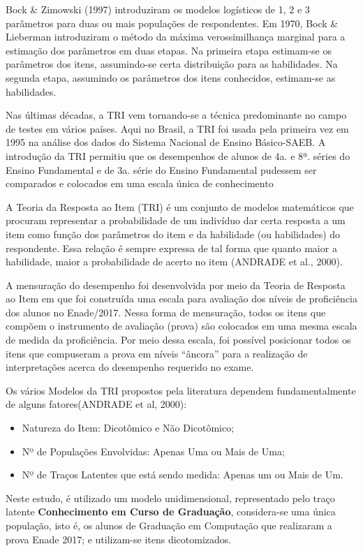 \documentclass[12pt]{article}
\begin{document}
Bock \& Zimowski (1997) introduziram os modelos logísticos de 1, 2 e 3 parâmetros para duas ou mais populações de respondentes. Em 1970, Bock \& Lieberman introduziram o método da máxima verossimilhança marginal para a estimação dos parâmetros em duas etapas. Na primeira etapa estimam-se os parâmetros dos itens, assumindo-se certa distribuição para as habilidades. Na segunda etapa, assumindo os parâmetros dos itens conhecidos, estimam-se as habilidades.

Nas últimas décadas, a TRI vem tornando-se a técnica predominante no campo de testes em vários países. Aqui no Brasil, a TRI foi usada pela primeira vez em 1995 na análise dos dados do Sistema Nacional de Ensino Básico-SAEB. A introdução da TRI permitiu que os desempenhos de alunos de 4a. e 8ª. séries do Ensino Fundamental e de 3a. série do Ensino Fundamental pudessem ser comparados e colocados em uma escala única de conhecimento


A Teoria da Resposta ao Item (TRI) é um conjunto de modelos matemáticos que procuram representar a probabilidade de um indivíduo dar certa resposta a um item como função dos parâmetros do item e da habilidade (ou habilidades) do respondente. Essa relação é sempre expressa de tal forma que quanto maior a habilidade, maior a probabilidade de acerto no item (ANDRADE et al., 2000).

A mensuração do desempenho foi desenvolvida por meio da Teoria de Resposta ao Item em que foi construída uma escala para avaliação dos níveis de proficiência dos alunos no Enade/2017. Nessa forma de mensuração, todos os itens que compõem o instrumento de avaliação (prova) são colocados em uma mesma escala de medida da proficiência. Por meio dessa escala, foi possível posicionar todos os itens que compuseram a prova em níveis “âncora” para a realização de interpretações acerca do desempenho requerido no exame.

Os vários Modelos da TRI propostos pela literatura dependem fundamentalmente de alguns fatores(ANDRADE et al, 2000):\vskip0.3cm

\begin{itemize}
\item Natureza do Item: Dicotômico e Não Dicotômico;
\item Nº de Populações Envolvidas: Apenas Uma ou Mais de Uma;
\item Nº de Traços Latentes que está sendo medida: Apenas um ou Mais de Um.
\end{itemize}


Neste estudo, é utilizado um modelo unidimensional, representado pelo traço latente \textbf{Conhecimento em Curso de Graduação}, considera-se uma única população, isto é, os alunos de Graduação em Computação que realizaram a prova Enade 2017; e utilizam-se itens dicotomizados.\vskip0.3cm
\end{document}
